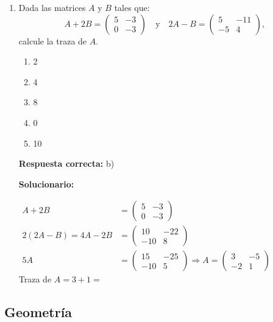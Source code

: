 \begin{enumerate}[resume]

	\item Dada las matrices $A$ y $B$ tales que:
	\[
	A+2B=\begin{pmatrix} 5 & -3\\ 0 & -3\end{pmatrix}
	\quad \text{y}\quad
	2A-B=\begin{pmatrix} 5 & -11\\ -5 & 4\end{pmatrix},
	\]
	calcule la traza de $A$.

	\begin{enumerate}[label=\alph*)]
		\item 2
		\item 4
		\item 8
		\item 0
		\item 10
	\end{enumerate}

	\textbf{Respuesta correcta:} b)

	\vspace{2mm}
	\textbf{Solucionario:}\

	$
	\begin{aligned}
		A+2B &= \begin{pmatrix}5 & -3\\ 0 & -3\end{pmatrix}\\
		2(2A-B) = 4A-2B &= \begin{pmatrix}10 & -22\\ -10 & 8\end{pmatrix}\\
		5A &= \begin{pmatrix}15 & -25\\ -10 & 5\end{pmatrix}
		\Rightarrow
		A = \begin{pmatrix}3 & -5\\ -2 & 1\end{pmatrix}
	\end{aligned}
	$
	\\
	Traza de $A = 3+1=$




\end{enumerate}






\subsection*{Geometría}

